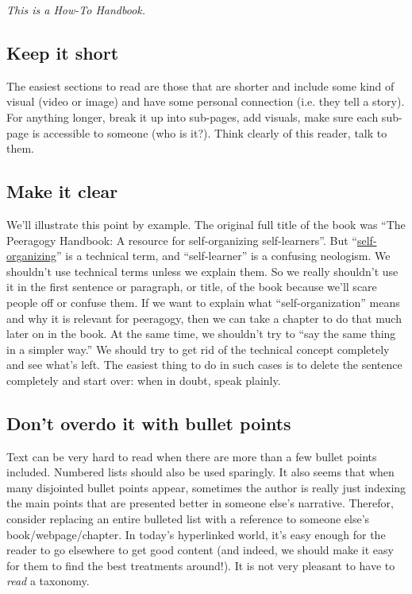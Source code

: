 \emph{This is a How-To Handbook.}

\subsection{Keep it short}

The easiest sections to read are those that are shorter and include some
kind of visual (video or image) and have some personal connection (i.e.
they tell a story). For anything longer, break it up into sub-pages, add
visuals, make sure each sub-page is accessible to someone (who is it?).
Think clearly of this reader, talk to them.

\subsection{Make it clear}

We'll illustrate this point by example. The original full title of the
book was ``The Peeragogy Handbook: A resource for self-organizing
self-learners''. But
``\href{http://en.wikipedia.org/wiki/Self-organization}{self-organizing}''
is a technical term, and ``self-learner'' is a confusing neologism. We
shouldn't use technical terms unless we explain them. So we really
shouldn't use it in the first sentence or paragraph, or title, of the
book because we'll scare people off or confuse them. If we want to
explain what ``self-organization'' means and why it is relevant for
peeragogy, then we can take a chapter to do that much later on in the
book. At the same time, we shouldn't try to ``say the same thing in a
simpler way.'' We should try to get rid of the technical concept
completely and see what's left. The easiest thing to do in such cases is
to delete the sentence completely and start over: when in doubt, speak
plainly.

\subsection{Don't overdo it with bullet points}

Text can be very hard to read when there are more than a few bullet
points included. Numbered lists should also be used sparingly. It also
seems that when many disjointed bullet points appear, sometimes the
author is really just indexing the main points that are presented better
in someone else's narrative. Therefor, consider replacing an entire
bulleted list with a reference to someone else's book/webpage/chapter.
In today's hyperlinked world, it's easy enough for the reader to go
elsewhere to get good content (and indeed, we should make it easy for
them to find the best treatments around!). It is not very pleasant to
have to \emph{read} a taxonomy.

